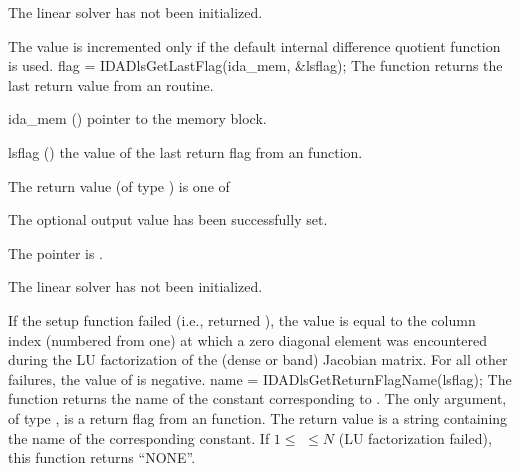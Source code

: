 {{\begin{args}
    The {\idadense} linear solver has not been initialized.
  \end{args}
}
{
  The value  is incremented only if the default 
  internal difference quotient function is used.
}
{
  flag = IDADlsGetLastFlag(ida\_mem, \&lsflag);
}
{
  The function  returns the
  last return value from an {\idadls} routine. 
}
{
  \begin{args}
  \item[ida\_mem] ()
    pointer to the {\ida} memory block.
  \item[lsflag] ()
    the value of the last return flag from an {\idadls} function.
  \end{args}
}
{
  The return value  (of type ) is one of
  \begin{args}
  \item[\Id{IDADLS\_SUCCESS}] 
    The optional output value has been successfully set.
  \item[\Id{IDADLS\_MEM\_NULL}]
    The  pointer is .
  \item[\Id{IDADLS\_LMEM\_NULL}]
    The {\idadense} linear solver has not been initialized.
  \end{args}
}
{
  If the {\idadense} setup function failed (i.e.,  returned
  ), the value  is equal to the column index
  (numbered from one) at which a zero diagonal element was encountered during
  the LU factorization of the (dense or band) Jacobian matrix.
  For all other failures, the value of  is negative.
}
{
  name = IDADlsGetReturnFlagName(lsflag);
}
{
  The function  returns the
  name of the {\idadls} constant corresponding to .
}
{
  The only argument, of type , is a return flag from an {\idadls} function.
}
{
  The return value is a string containing the name of the corresponding
  constant.  If $1 \leq $  $ \leq N$ (LU factorization failed), this
  function returns ``NONE''.
}
{}

%
%
}
